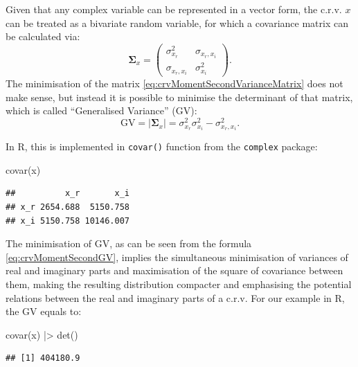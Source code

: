 \documentclass[
]{book}
\newenvironment{Shaded}{\begin{snugshade}}{\end{snugshade}}
\newcommand{\FunctionTok}[1]{\textcolor[rgb]{0.00,0.00,0.00}{#1}}
\newcommand{\NormalTok}[1]{#1}
\newcommand{\SpecialCharTok}[1]{\textcolor[rgb]{0.00,0.00,0.00}{#1}}
\begin{document}
Given that any complex variable can be represented in a vector form, the c.r.v. \(x\) can be treated as a bivariate random variable, for which a covariance matrix can be calculated via:
\begin{equation}
    \boldsymbol{\Sigma}_x = \begin{pmatrix} \sigma_{x_r}^2 & \sigma_{x_r, x_i} \\ \sigma_{x_r, x_i} & \sigma_{x_i}^2 \end{pmatrix} .
    \label{eq:crvMomentSecondVarianceMatrix}
\end{equation}
The minimisation of the matrix \eqref{eq:crvMomentSecondVarianceMatrix} does not make sense, but instead it is possible to minimise the determinant of that matrix, which is called ``Generalised Variance'' (GV):
\begin{equation}
    \mathrm{GV} = |\boldsymbol{\Sigma}_x| = \sigma_{x_r}^2 \sigma_{x_i}^2 - \sigma_{x_r, x_i}^2 .
    \label{eq:crvMomentSecondGV}
\end{equation}

In R, this is implemented in \texttt{covar()} function from the \texttt{complex} package:

\begin{Shaded}
\begin{Highlighting}[]
\FunctionTok{covar}\NormalTok{(x)}
\end{Highlighting}
\end{Shaded}

\begin{verbatim}
##          x_r       x_i
## x_r 2654.688  5150.758
## x_i 5150.758 10146.007
\end{verbatim}

The minimisation of GV, as can be seen from the formula \eqref{eq:crvMomentSecondGV}, implies the simultaneous minimisation of variances of real and imaginary parts and maximisation of the square of covariance between them, making the resulting distribution compacter and emphasising the potential relations between the real and imaginary parts of a c.r.v. For our example in R, the GV equals to:

\begin{Shaded}
\begin{Highlighting}[]
\FunctionTok{covar}\NormalTok{(x) }\SpecialCharTok{|\textgreater{}} \FunctionTok{det}\NormalTok{()}
\end{Highlighting}
\end{Shaded}

\begin{verbatim}
## [1] 404180.9
\end{verbatim}
\end{document}

